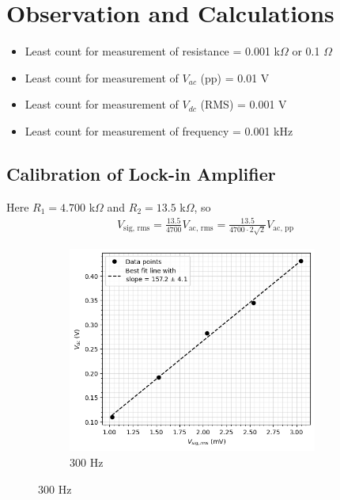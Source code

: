 \section{Observation and Calculations}

\begin{itemize}
    \item Least count for measurement of resistance = 0.001 k$\Omega$ or 0.1 $\Omega$
    \item Least count for measurement of $V_{ac}$ (pp) = 0.01 V
    \item Least count for measurement of $V_{dc}$ (RMS) = 0.001 V
    \item Least count for measurement of frequency = 0.001 kHz
\end{itemize}

\subsection{Calibration of Lock-in Amplifier}

\noindent Here $R_1 = 4.700$ k$\Omega$ and $R_2 = 13.5$ k$\Omega$, so 
\begin{align*}
    V_\text{sig, rms} = \frac{13.5}{4700}V_\text{ac, rms} = \frac{13.5}{4700\cdot 2\sqrt{2}} V_\text{ac, pp}
\end{align*}



\begin{figure}[H]
    \begin{subfigure}{\linewidth}
    \includegraphics[width=0.9\textwidth]{images/a1.png}
    \caption{300 Hz}
    \end{subfigure}

    \end{figure}
    
